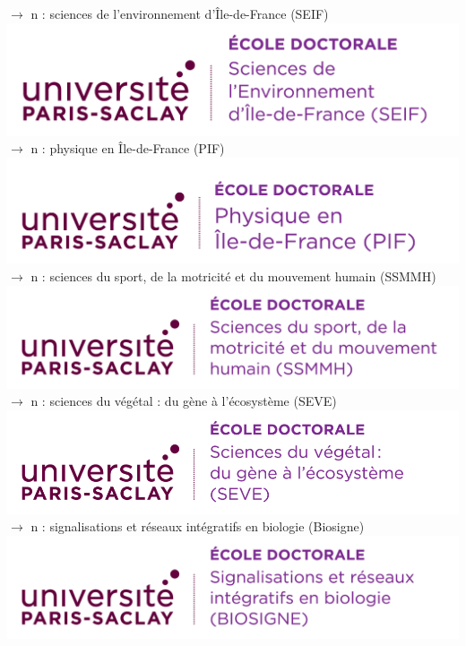 \documentclass[french,12pt,a4paper]{book}
\begin{document}
\noindent \textbf{\color{Prune}$\rightarrow$} n : sciences de l'environnement d’Île-de-France (SEIF) \\
\includegraphics[scale=.7]{logo_usp_SEIF.png}\\

\noindent \textbf{\color{Prune}$\rightarrow$} n : physique en Île-de-France (PIF)\\    \includegraphics[scale=.7]{logo_usp_PIF.png}\\

\noindent \textbf{\color{Prune}$\rightarrow$} n : sciences du sport, de la motricité et du mouvement humain (SSMMH)\\
\includegraphics[scale=.7]{logo_usp_SSMMH.png}\\
\newpage
\noindent \textbf{\color{Prune}$\rightarrow$} n : sciences du végétal : du gène à l'écosystème (SEVE)\\
\includegraphics[scale=.55]{logo_usp_SEVE.png}\\

\noindent \textbf{\color{Prune}$\rightarrow$} n : signalisations et réseaux intégratifs en biologie (Biosigne)\\
\includegraphics[scale=.7]{logo_usp_BIOSIGNE.png}\\
\end{document}
